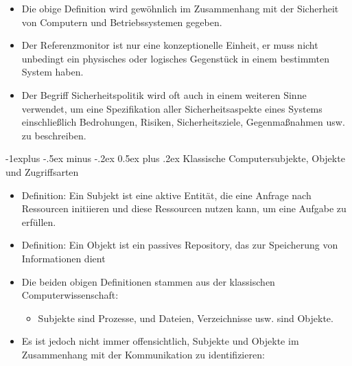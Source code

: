\documentclass[a4paper]{article}
\makeatletter
\renewcommand{\subsection}{\@startsection{subsection}{2}{0mm}%
 {-1explus -.5ex minus -.2ex}%
 {0.5ex plus .2ex}%
 {\normalfont\normalsize\bfseries}}
\makeatother
\begin{document}
\begin{multicols}{3}
\begin{itemize}
              \begin{itemize}
                  \item
                        Die obige Definition wird gewöhnlich im Zusammenhang mit der
                        Sicherheit von Computern und Betriebssystemen gegeben.
                  \item
                        Der Referenzmonitor ist nur eine konzeptionelle Einheit, er muss
                        nicht unbedingt ein physisches oder logisches Gegenstück in einem
                        bestimmten System haben.
                  \item
                        Der Begriff Sicherheitspolitik wird oft auch in einem weiteren Sinne
                        verwendet, um eine Spezifikation aller Sicherheitsaspekte eines
                        Systems einschließlich Bedrohungen, Risiken, Sicherheitsziele,
                        Gegenmaßnahmen usw. zu beschreiben.
              \end{itemize}
    \end{itemize}


    \subsection{Klassische Computersubjekte, Objekte und
        Zugriffsarten}

    \begin{itemize}
        \item
              Definition: Ein Subjekt ist eine aktive Entität, die eine Anfrage nach
              Ressourcen initiieren und diese Ressourcen nutzen kann, um eine
              Aufgabe zu erfüllen.
        \item
              Definition: Ein Objekt ist ein passives Repository, das zur
              Speicherung von Informationen dient
        \item
              Die beiden obigen Definitionen stammen aus der klassischen
              Computerwissenschaft:

              \begin{itemize}
                  \item
                        Subjekte sind Prozesse, und Dateien, Verzeichnisse usw. sind
                        Objekte.
              \end{itemize}
        \item
              Es ist jedoch nicht immer offensichtlich, Subjekte und Objekte im
              Zusammenhang mit der Kommunikation zu identifizieren:


\end{itemize}
\end{multicols}
\end{document}
